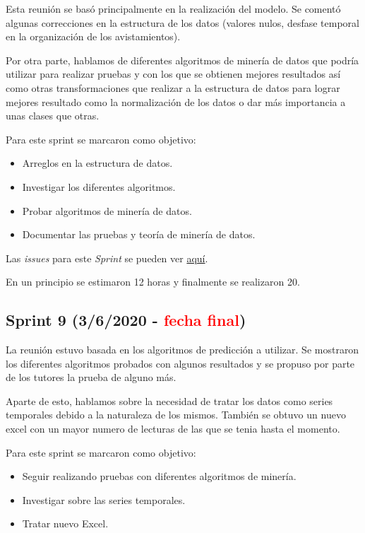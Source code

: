 Esta reunión se basó principalmente en la realización del modelo. Se comentó algunas correcciones en la estructura de los datos (valores nulos, desfase temporal en la organización de los avistamientos).

Por otra parte, hablamos de diferentes algoritmos de minería de datos que podría utilizar para realizar pruebas y con los que se obtienen mejores resultados así como otras transformaciones que realizar a la estructura de datos para lograr mejores resultado como la normalización de los datos o dar más importancia a unas clases que otras.

Para este sprint se marcaron como objetivo:
\begin{itemize}
	\item Arreglos en la estructura de datos.
	\item Investigar los diferentes algoritmos.
	\item Probar algoritmos de minería de datos.
	\item Documentar las pruebas y teoría de minería de datos.
\end{itemize} 

Las \emph{issues} para este \emph{Sprint} se pueden ver \href{https://github.com/psnti/TFG-Pablo-Santidrian-Tudanca/milestone/8}{aquí}.


En un principio se estimaron 12 horas y finalmente se realizaron 20.

\subsection{Sprint 9 (3/6/2020 - \textcolor{red}{fecha final})}\label{Sprint-5}
La reunión estuvo basada en los algoritmos de predicción a utilizar. Se mostraron los diferentes algoritmos probados con algunos resultados y se propuso por parte de los tutores la prueba de alguno más.

Aparte de esto, hablamos sobre la necesidad de tratar los datos como series temporales debido a la naturaleza de los mismos. También se obtuvo un nuevo excel con un mayor numero de lecturas de las que se tenia hasta el momento.


Para este sprint se marcaron como objetivo:
\begin{itemize}
	\item Seguir realizando pruebas con diferentes algoritmos de minería.
	\item Investigar sobre las series temporales.
	\item Tratar nuevo Excel.
\end{itemize} 

